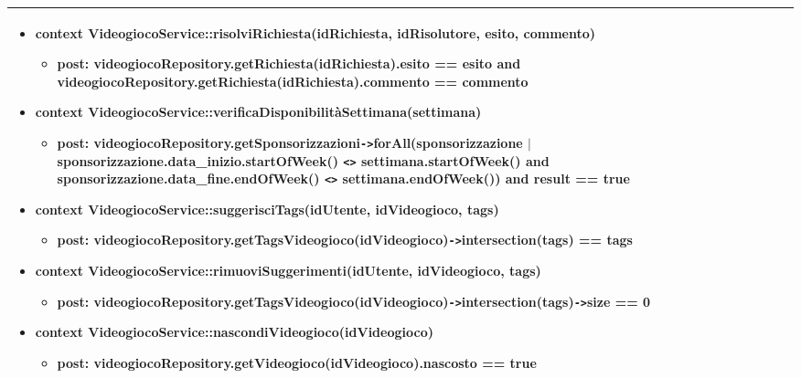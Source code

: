 \begin{tabular}{|| l | p{28em} ||}
\begin{itemize}[leftmargin=*]
		\item \textbf{context} VideogiocoService::risolviRichiesta(idRichiesta, idRisolutore, esito, commento)
		\begin{itemize}
			\item[ ] \textbf{post:} videogiocoRepository.getRichiesta(idRichiesta).esito == esito and videogiocoRepository.getRichiesta(idRichiesta).commento == commento
		\end{itemize}

		\item \textbf{context} VideogiocoService::verificaDisponibilitàSettimana(settimana)
		\begin{itemize}
			\item[ ] \textbf{post:} videogiocoRepository.getSponsorizzazioni\verb|->|forAll(sponsorizzazione $|$ sponsorizzazione.data\_inizio.startOfWeek() \verb|<>| settimana.startOfWeek() and sponsorizzazione.data\_fine.endOfWeek() \verb|<>| settimana.endOfWeek()) and result == true
		\end{itemize}

		\item \textbf{context} VideogiocoService::suggerisciTags(idUtente, idVideogioco, tags)
		\begin{itemize}
			\item[ ] \textbf{post:} videogiocoRepository.getTagsVideogioco(idVideogioco)\verb|->|intersection(tags) == tags
		\end{itemize}

		\item \textbf{context} VideogiocoService::rimuoviSuggerimenti(idUtente, idVideogioco, tags)
		\begin{itemize}
			\item[ ] \textbf{post:} videogiocoRepository.getTagsVideogioco(idVideogioco)\verb|->|intersection(tags)\verb|->|size == 0
		\end{itemize}

		\item \textbf{context} VideogiocoService::nascondiVideogioco(idVideogioco)
		\begin{itemize}
			\item[ ] \textbf{post:} videogiocoRepository.getVideogioco(idVideogioco).nascosto == true
		\end{itemize}
	\end{itemize}\\
	\hline
\end{tabular}

\newpage
